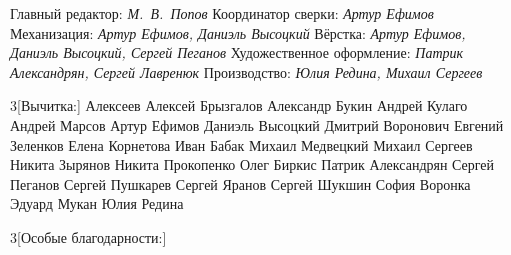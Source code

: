 \documentclass[a5paper, 10pt, twoside, onecolumn, openany]{memoir}
\begin{document}
\begin{footnotesize}
  \noindent
  Главный редактор: \textit{М.~В.~Попов}\newline
  Координатор сверки: \textit{Артур Ефимов}\newline
  Механизация: \textit{Артур Ефимов, Даниэль Высоцкий}\newline
  Вёрстка: \textit{Артур Ефимов, Даниэль Высоцкий, Сергей Пеганов}\newline
  Художественное оформление: \textit{Патрик Александрян, Сергей Лавренюк}\newline
  Производство: \textit{Юлия Редина, Михаил Сергеев}

  \vspace{-0.75ex}
  \begin{multicols}{3}[\noindent Вычитка:\vspace{-3ex}]
    \noindent{} Алексеев\newline
    Алексей Брызгалов\newline
    Александр Букин\newline
    Андрей Кулаго\newline
    Андрей Марсов\newline
    Артур Ефимов\newline
    Даниэль Высоцкий\newline
    Дмитрий Воронович\newline
    Евгений Зеленков\newline
    Елена Корнетова\newline
    Иван Бабак\newline
    Михаил Медвецкий\newline
    Михаил Сергеев\newline
    Никита Зырянов\newline
    Никита Прокопенко\newline
    Олег Биркис\newline
    Патрик Александрян\newline
    Сергей Пеганов\newline
    Сергей Пушкарев\newline
    Сергей Яранов\newline
    Сергей Шукшин\newline
    София Воронка\newline
    Эдуард Мукан\newline
    Юлия Редина
  \end{multicols}
  \vspace{-4ex}
  \begin{multicols}{3}[\noindent Особые благодарности:\vspace{-3ex}]

\end{multicols}
\end{footnotesize}
\end{document}
